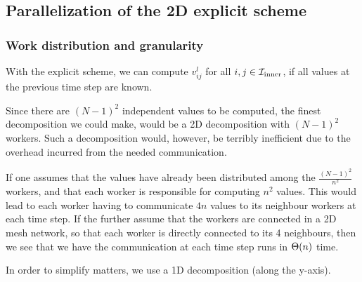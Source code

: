 \subsection{Parallelization of the 2D explicit scheme}
\subsubsection{Work distribution and granularity}
\cite{inf3380_bok}
With the explicit scheme, we can compute $v_{ij}^l$ for all $i, j \in \mathcal{I}_{\mathrm{inner}}$, if all values at the previous time step are known.

Since there are $(N - 1)^2$ independent values to be computed, the finest decomposition we could make, would be a 2D decomposition with $(N - 1)^2$ workers. Such a decomposition would, however, be terribly inefficient due to the overhead incurred from the needed communication.

If one assumes that the values have already been distributed among the $\frac{(N-1)^2}{n^2}$ workers, and that each worker is responsible for computing $n^2$ values. This would lead to each worker having to communicate $4n$ values to its neighbour workers at each time step. If the further assume that the workers are connected in a 2D mesh network, so that each worker is directly connected to its 4 neighbours, then we see that we have the communication at each time step runs in $\Theta (n)$ time.

In order to simplify matters, we use a 1D decomposition (along the y-axis).
